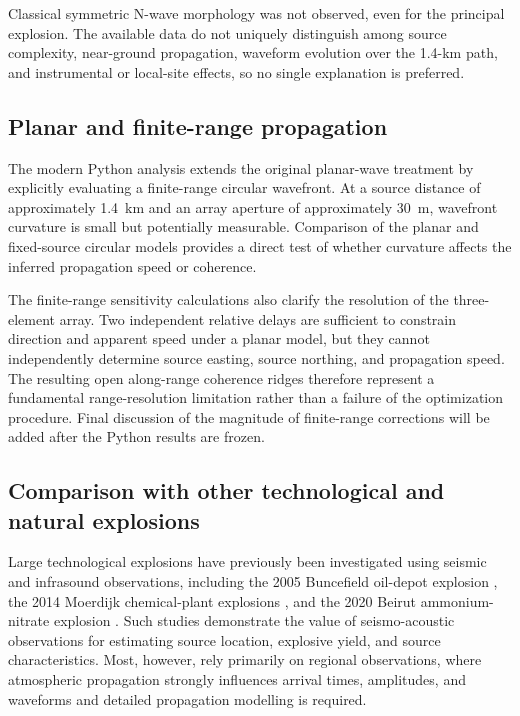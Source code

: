 \documentclass[]{seismica}
\begin{document}
Classical symmetric N-wave morphology was not observed, even for the
principal explosion. The available data do not uniquely distinguish among
source complexity, near-ground propagation, waveform evolution over the
1.4-km path, and instrumental or local-site effects, so no single explanation
is preferred.

\subsection{Planar and finite-range propagation}
\label{sec:discussion_propagation}

The modern Python analysis extends the original planar-wave treatment by explicitly evaluating a finite-range circular wavefront. At a source distance of approximately 1.4~km and an array aperture of approximately 30~m, wavefront curvature is small but potentially measurable. Comparison of the planar and fixed-source circular models provides a direct test of whether curvature affects the inferred propagation speed or coherence.

The finite-range sensitivity calculations also clarify the resolution of the three-element array. Two independent relative delays are sufficient to constrain direction and apparent speed under a planar model, but they cannot independently determine source easting, source northing, and propagation speed. The resulting open along-range coherence ridges therefore represent a fundamental range-resolution limitation rather than a failure of the optimization procedure. Final discussion of the magnitude of finite-range corrections will be added after the Python results are frozen.

\subsection{Comparison with other technological and natural explosions}
\label{sec:discussion_comparison}

Large technological explosions have previously been investigated using
seismic and infrasound observations, including the 2005 Buncefield oil-depot
explosion \citep{ottemoller_2008,green_2008,ceranna_2009}, the 2014 Moerdijk
chemical-plant explosions \citep{smink_2019}, and the 2020 Beirut
ammonium-nitrate explosion
\citep{pilger_beirut_2021,kim_pasyanos_2022}. Such studies demonstrate the value of seismo-acoustic observations for estimating source location, explosive yield, and source characteristics. Most, however, rely primarily on regional observations, where atmospheric propagation strongly influences arrival times, amplitudes, and waveforms and detailed propagation modelling is required.
\end{document}
